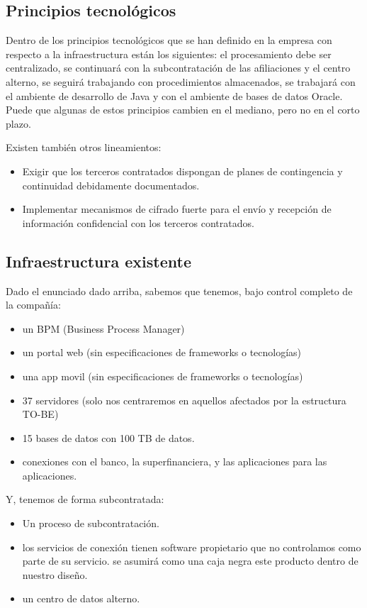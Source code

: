 \documentclass[a4paper]{article}
\begin{document}
\subsection{Principios tecnológicos}

Dentro de los principios tecnológicos que se han definido en la empresa con respecto a la infraestructura están los
siguientes: el procesamiento debe ser centralizado, se continuará con la subcontratación de las afiliaciones y el
centro alterno, se seguirá trabajando con procedimientos almacenados, se trabajará con el ambiente de desarrollo
de Java y con el ambiente de bases de datos Oracle. Puede que algunas de estos principios cambien en el mediano,
pero no en el corto plazo.

Existen también otros lineamientos:
\begin{itemize}
    \item Exigir que los terceros contratados dispongan de planes de contingencia y continuidad debidamente
    documentados.
    \item Implementar mecanismos de cifrado fuerte para el envío y recepción de información confidencial con los
    terceros contratados.
\end{itemize}

\subsection{Infraestructura existente}
Dado el enunciado dado arriba, sabemos que tenemos, bajo control completo de la compañía:
\begin{itemize}
    \item un BPM (Business Process Manager)
    \item un portal web (sin especificaciones de frameworks o tecnologías)
    \item una app movil (sin especificaciones de frameworks o tecnologías)
    \item 37 servidores (solo nos centraremos en aquellos afectados por la estructura TO-BE)
    \item 15 bases de datos con 100 TB de datos.
    \item conexiones con el banco, la superfinanciera, y las aplicaciones para las aplicaciones.
\end{itemize}

Y, tenemos de forma subcontratada:

\begin{itemize}
    \item Un proceso de subcontratación.
    \item los servicios de conexión tienen software propietario que no controlamos como parte de su servicio. 
    se asumirá como una caja negra este producto dentro de nuestro diseño.
    \item un centro de datos alterno. 
\end{itemize}
\end{document}
